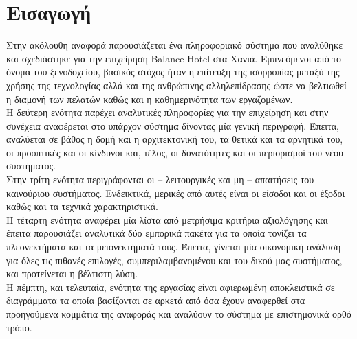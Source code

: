 \chapter{Εισαγωγή}

Στην ακόλουθη αναφορά παρουσιάζεται ένα πληροφοριακό σύστημα που 
αναλύθηκε και σχεδιάστηκε για την επιχείρηση Balance Hotel στα Χανιά. 
Εμπνεόμενοι από το όνομα του ξενοδοχείου, βασικός στόχος ήταν η επίτευξη 
της ισορροπίας μεταξύ της χρήσης της τεχνολογίας αλλά και της ανθρώπινης 
αλληλεπίδρασης ώστε να βελτιωθεί η διαμονή των πελατών καθώς και η 
καθημερινότητα των εργαζομένων.\\ 

\noindent
Η δεύτερη ενότητα παρέχει αναλυτικές πληροφορίες για την επιχείρηση 
και στην συνέχεια αναφέρεται στο υπάρχον σύστημα δίνοντας μία γενική 
περιγραφή. Έπειτα, αναλύεται σε βάθος η δομή και η αρχιτεκτονική του, τα 
θετικά και τα αρνητικά του, οι προοπτικές και οι κίνδυνοι και, τέλος, οι 
δυνατότητες και οι περιορισμοί του νέου συστήματος.\\

\noindent
Στην τρίτη ενότητα περιγράφονται οι – λειτουργικές και μη – απαιτήσεις 
του καινούριου συστήματος. Ενδεικτικά, μερικές από αυτές είναι οι είσοδοι 
και οι έξοδοι καθώς και τα τεχνικά χαρακτηριστικά.\\

\noindent
Η τέταρτη ενότητα αναφέρει μία λίστα από μετρήσιμα κριτήρια αξιολόγησης 
και έπειτα παρουσιάζει αναλυτικά δύο εμπορικά πακέτα για τα οποία τονίζει 
τα πλεονεκτήματα και τα μειονεκτήματά τους. Έπειτα, γίνεται μία οικονομική
ανάλυση για όλες τις πιθανές επιλογές, συμπεριλαμβανομένου και του δικού 
μας συστήματος, και προτείνεται η βέλτιστη λύση.\\

\noindent
Η πέμπτη, και τελευταία, ενότητα της εργασίας είναι αφιερωμένη αποκλειστικά 
σε διαγράμματα τα οποία βασίζονται σε αρκετά από όσα έχουν αναφερθεί στα 
προηγούμενα κομμάτια της αναφοράς και αναλύουν το σύστημα με 
επιστημονικά ορθό τρόπο.



